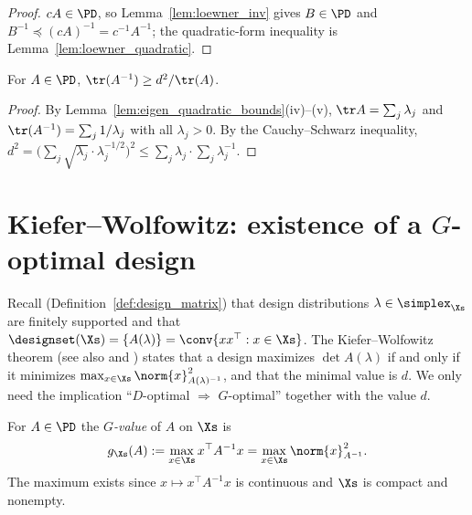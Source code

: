 \begin{proof}
\leanok
{}
$cA \in \PD$, so Lemma~\ref{lem:loewner_inv} gives $B \in \PD$ and
$B^{-1} \preceq (cA)^{-1} = c^{-1}A^{-1}$; the quadratic-form inequality is
Lemma~\ref{lem:loewner_quadratic}.
\end{proof}

\begin{lemma}\label{lem:trace_inv_amhm}
\leanok
{}
For $A \in \PD$, $\tr(A^{-1}) \ge d^2/\tr(A)$.
\end{lemma}

\begin{proof}
\leanok
{}
By Lemma~\ref{lem:eigen_quadratic_bounds}(iv)--(v), $\tr A = \sum_j \lambda_j$ and $\tr(A^{-1}) =
\sum_j 1/\lambda_j$ with all $\lambda_j > 0$. By the Cauchy--Schwarz inequality,
$d^2 = \big(\sum_j \sqrt{\lambda_j}\cdot\lambda_j^{-1/2}\big)^2 \le \sum_j\lambda_j\cdot\sum_j
\lambda_j^{-1}$.
\end{proof}

\section{Kiefer--Wolfowitz: existence of a \texorpdfstring{$G$}{G}-optimal design}
\label{sec:design_kw}

Recall (Definition~\ref{def:design_matrix}) that design distributions $\lambda \in \simplex_{\Xs}$
are finitely supported and that $\designset(\Xs) = \{A(\lambda)\} = \conv\{xx^\top : x \in \Xs\}$.
The Kiefer--Wolfowitz theorem \cite{kiefer1960equivalence} (see also
\cite[Chapter~9]{pukelsheim2006optimal} and \cite[Chapter~21]{lattimore2020bandit}) states that
a design maximizes $\det A(\lambda)$ if and only if it minimizes $\max_{x \in \Xs}
\norm{x}_{A(\lambda)^{-1}}^2$, and that the minimal value is $d$. We only need the implication
``$D$-optimal $\Rightarrow$ $G$-optimal'' together with the value $d$.

\begin{definition}\label{def:g_value}
\leanok
{}
For $A \in \PD$ the \emph{$G$-value} of $A$ on $\Xs$ is
\[
  g_{\Xs}(A) := \max_{x \in \Xs} x^\top A^{-1} x = \max_{x\in\Xs}\norm{x}_{A^{-1}}^2 .
\]
The maximum exists since $x \mapsto x^\top A^{-1} x$ is continuous and $\Xs$ is compact and
nonempty.
\end{definition}

